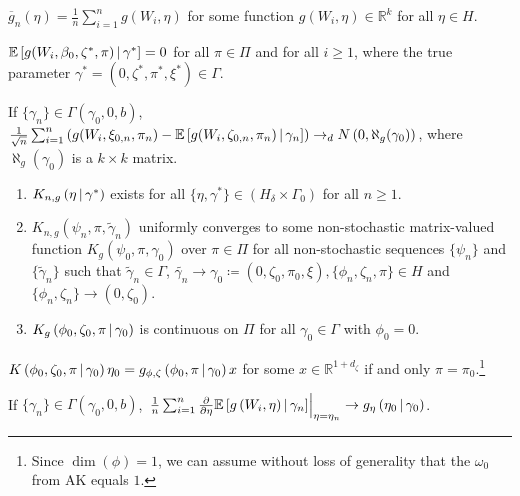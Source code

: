 \documentclass[11pt]{article}
\newcommand*{\R}{\mathbb{R}}
\newcommand*{\E}{\mathbb{E}}
\newcommand*{\N}{N}
\newcommand*{\dto}{\ensuremath{\to_d}}
\newcommand*{\Eta}{H}
\newcommand*{\popmom}{\ensuremath{g}}
\newcommand*{\sampmom}{\ensuremath{\overline{g}_n}}
\newcommand{\mvert}[1][\middle]{\ensuremath{\,#1\vert\,}}
\begin{document}
\begin{assump}[GMM 3]\label{ass:GMM3}
\begin{assumplist}
    \item $\sampmom(\eta) = \frac{1}{n} \sum_{i=1}^n \popmom(W_i, \eta)$  for some function $\popmom(W_i,
        \eta) \in \R^k$ for all $\eta \in \Eta$.
        \label{ass:GMM3a}
    \item $\E\left[\popmom(W_i, \beta_0, \zeta^{*}, \pi) \mvert \gamma^{*} \right] = 0$ for all $\pi \in \Pi$ and
        for all $i \geq 1$, where the true parameter $\gamma^{*} = \left(0,\zeta^{*}, \pi^{*}, \xi^{*}
        \right) \in \Gamma$.
        \label{ass:GMM3b}
    \item If $\{ \gamma_n \} \in \Gamma(\gamma_0, 0, b)$, $\frac{1}{\sqrt{n}} \sum_{i=1}^n \left(g(W_i,
        \xi_{0,n}, \pi_n) - \E \left[g(W_i, \zeta_{0,n}, \pi_n)\mvert \gamma_n \right]\right)  \dto \N\left(0,
        \aleph_g(\gamma_0)\right)$, where $\aleph_{g}(\gamma_0)$ is a $k \times k$ matrix.
    \item 
        \label{ass:GMM3c}
        \begin{enumerate}
            \item  $K_{n,g}\left(\eta \mvert \gamma^{*}\right)$ exists for all $\{\eta, \gamma^{*} \} \in
                \left(\Eta_{\delta} \times \Gamma_{0}\right)$ for all $n \geq 1$.
            \item $K_{n,g}(\psi_n, \pi, \tilde{\gamma}_n)$ uniformly converges to some non-stochastic matrix-valued
                function  $K_{g}(\psi_0, \pi, \gamma_0)$  over $\pi \in \Pi$ for all non-stochastic sequences $\{
                \psi_n \}$ and $\{ \tilde{\gamma}_n \}$ such that $\tilde{\gamma}_n \in \Gamma$, $\tilde{\gamma_n}
                \to \gamma_0 \coloneqq (0, \zeta_0, \pi_0, \xi), \{ \phi_n, \zeta_n, \pi \} \in \Eta$ and
                $\{\phi_n, \zeta_n \} \to (0, \zeta_0)$.
                \label{item:asymptotic_valid_cov}
            \item $K_g\left(\phi_0, \zeta_0, \pi \mvert \gamma_0\right)$ is continuous on $\Pi$ for all  $\gamma_0
                \in \Gamma$ with $\phi_0 = 0$.
        \end{enumerate}
        \item $K\left(\phi_0, \zeta_0, \pi \mvert \gamma_0\right) \eta_0 = \popmom_{\phi, \zeta}\left(\phi_0,
            \pi\mvert \gamma_0\right) x$ for some $x \in \R^{1+d_{\zeta}}$ if and only $\pi =
            \pi_0$.\footnote{Since $\dim(\phi) = 1$, we can assume without loss of generality that the $\omega_0$
            from AK equals $1$.}
        \label{ass:GMM3d}
        \item If $\{ \gamma_n \} \in \Gamma(\gamma_0, 0, b)$, $\left. \frac{1}{n} \sum_{i=1}^n
            \frac{\partial}{\partial \eta}  \E \left[ \popmom\left(W_i, \eta\right ) \mvert \gamma_n \right]
            \right\rvert_{\eta = \eta_n} \to \popmom_{\eta}\left(\eta_0 \mvert \gamma_0\right)$.
        \label{ass:GMM3e}
\end{assumplist}
\end{assump}
\end{document}
